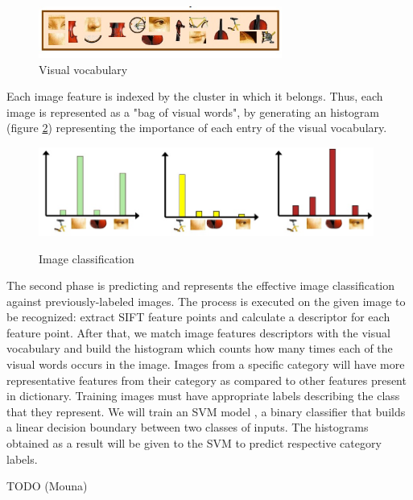 \documentclass[smallextended]{svjour3}       %
\begin{document}
\begin{figure}[h]
\centering
\includegraphics[width=8cm]{img/bow}
\caption{Visual vocabulary}
\label{bow}
\end{figure}

Each image feature is indexed by the cluster in which it belongs. Thus, each image is represented as a "bag of visual words", by generating an histogram (figure \ref{hist}) representing the importance of each entry of the visual vocabulary.

\begin{figure}[h]
\centering
\includegraphics[width=11cm]{img/classify}
\label{hist}
\caption{Image classification}
\end{figure}

The second phase is predicting and represents the effective image classification against previously-labeled images. The process is executed on the given image to be recognized: extract SIFT feature points and calculate a descriptor for each feature point. After that, we match image features descriptors with the visual vocabulary and build the histogram which counts how many times each of the visual words occurs in the
image. Images from a specific category will have more representative features from their category as compared to other features present in dictionary. Training images must have appropriate labels describing the class that they represent. We will train an SVM model \cite{svm}, a binary classifier that builds a linear decision boundary between two classes of inputs. The histograms obtained as a result will be given to the SVM to predict respective category labels.



TODO (Mouna)
\end{document}
